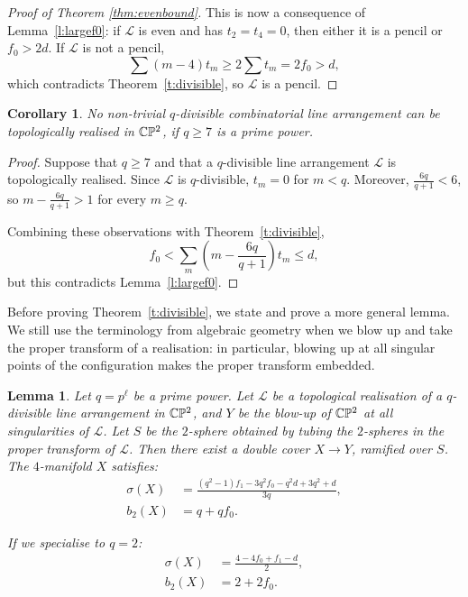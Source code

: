 \documentclass[a4paper,12pt, onesided]{amsart}
\newtheorem{lemma}[thm]{Lemma}
\newtheorem{cor}[thm]{Corollary}
\theoremstyle{remark}
\numberwithin{figure}{section}
\numberwithin{equation}{section}
\newcommand{\CP}{\mathbb{CP}\vphantom{\mathbb{P}}^2}
\renewcommand{\L}{\mathcal{L}}
\begin{document}
\begin{proof}[Proof of Theorem \ref{thm:evenbound}]
This is now a consequence of Lemma~\ref{l:largef0}: if $\L$ is even and has $t_2 = t_4 = 0$, then either it is a pencil or $f_0 > 2d$.
If $\L$ is not a pencil,
\[
\sum (m-4)t_m \ge 2 \sum t_m = 2f_0 > d,
\]
which contradicts Theorem~\ref{t:divisible}, so $\L$ is a pencil.
\end{proof}

\begin{cor}\label{c:smalldivisibility}
No non-trivial $q$-divisible combinatorial line arrangement can be topologically realised in $\CP$, if $q \ge 7$ is a prime power.
\end{cor}

\begin{proof}
Suppose that $q \ge 7$ and that a $q$-divisible line arrangement $\L$ is topologically realised.
Since $\L$ is $q$-divisible, $t_m = 0$ for $m < q$.
Moreover, $\frac{6q}{q+1} < 6$, so $m-\frac{6q}{q+1} > 1$ for every $m \ge q$.

Combining these observations with Theorem~\ref{t:divisible},
\[
f_0 < \sum_m (m-{\textstyle \frac{6q}{q+1}})t_m \le d,
\]
but this contradicts Lemma~\ref{l:largef0}.
\end{proof}

Before proving Theorem~\ref{t:divisible}, we state and prove a more general lemma.
We still use the terminology from algebraic geometry when we blow up and take the proper transform of a realisation:
in particular, blowing up at all singular points of the configuration makes the proper transform embedded.

\begin{lemma}\label{l:divisiblecover}
Let $q=p^\ell$ be a prime power. Let $\L$ be a topological realisation of a $q$-divisible line arrangement in $\CP$, and $Y$ be the blow-up of $\CP$ at all singularities of $\L$.
Let $S$ be the $2$-sphere obtained by tubing the $2$-spheres in the proper transform of $\L$.
Then there exist a double cover $X \to Y$, ramified over $S$.
The $4$-manifold $X$ satisfies:
\begin{align*}
\sigma(X) &= \frac{(q^2-1)f_1 - 3q^2f_0 - q^2d + 3q^2 + d}{3q},\\
b_2(X) &= q + qf_0.
\end{align*}

If we specialise to $q = 2$:
\begin{align*}
\sigma(X) &= \frac{4-4f_0+f_1-d}2,\\
b_2(X) &= 2 + 2f_0.
\end{align*}
\end{lemma}
\end{document}
